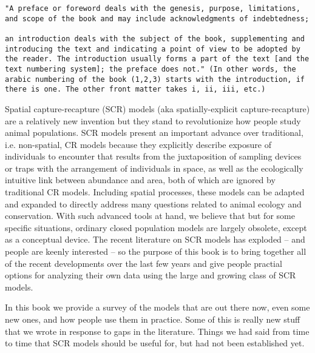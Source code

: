 \begin{verbatim}
"A preface or foreword deals with the genesis, purpose, limitations,
and scope of the book and may include acknowledgments of indebtedness;

an introduction deals with the subject of the book, supplementing and
introducing the text and indicating a point of view to be adopted by
the reader. The introduction usually forms a part of the text [and the
text numbering system]; the preface does not." (In other words, the
arabic numbering of the book (1,2,3) starts with the introduction, if
there is one. The other front matter takes i, ii, iii, etc.)
\end{verbatim}


Spatial capture-recapture (SCR) models (aka spatially-explicit
capture-recapture) are a relatively new invention but they stand to
revolutionize how people study animal populations.
SCR models present an important advance over traditional,
i.e. non-spatial, CR models because they explicitly describe exposure
of individuals to encounter that results from the juxtaposition of
sampling devices or traps with the arrangement of individuals in
space, as well as the ecologically intuitive link between abundance
and area, both of which are ignored by traditional CR
models. Including spatial processes, these models can be adapted and
expanded to directly address many questions related to animal ecology
and conservation. With such advanced tools at hand, we believe that
but for some specific situations, ordinary closed population models
are largely obsolete, except as a conceptual device.
The recent literature on SCR models has exploded -- and people are
keenly interested -- so the purpose of this book is to bring together
all of the recent developments over the last few years and give people
practial options for analyzing their own data using the large and
growing class of SCR models.

In this book we provide a survey of the models that are out there now,
even some new ones, and how people use them in practice. Some of this
is really new stuff that we wrote in response to gaps in the
literature. Things we had said from time to time that SCR models
should be useful for, but had not been established yet.

